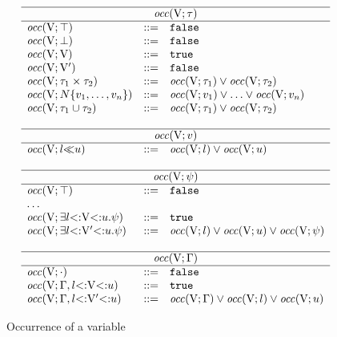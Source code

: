 \begin{figure}
\footnotesize
\[
\begin{array}{lcl}
    \hline
    \multicolumn{3}{c}{\occdflt{\ty}} \\ 
    \hline 
    \occdflt{\tyany} &::=& \false\\
    \occdflt{\tybot} &::=& \false\\
    \occdflt{\vany}  &::=& \true\\
    \occdflt{\vany'}  &::=& \false\\
    \occdflt{\typair{\ty_1}{\ty_2}}  &::=& \occdflt{\ty_1} \lor \occdflt{\ty_2}\\
    \occdflt{\tyinv\iname{\rexvar_1,\ldots,\rexvar_n}} &::=&
        \occdflt{\rexvar_1} \lor \ldots \lor \occdflt{\rexvar_n}\\
    \occdflt{\tyunion{\ty_1}{\ty_2}} &::=& \occdflt{\ty_1} \lor \occdflt{\ty_2}\\
    \\
    \hline
    \multicolumn{3}{c}{\occdflt{\rexvar}} \\ 
    \hline 
    \occdflt{\rexvarbound{\tylb}{\tyub}} &::=& \occdflt{\tylb} \lor \occdflt{\tyub}\\
    \\
    \hline
    \multicolumn{3}{c}{\occdflt{\tysig}} \\ 
    \hline 
    \occdflt{\tyany} &::=& \false\\
    \multicolumn{3}{l}{\ldots} \\
    \occdflt{\tyexist{\vany}{\tylb}{\tyub}{\tysig}} &::=& \true\\
    \occdflt{\tyexist{\vany'}{\tylb}{\tyub}{\tysig}} &::=& 
        \occdflt{\tylb} \lor \occdflt{\tyub} \lor \occdflt{\tysig}\\
    \\
    \hline
    \multicolumn{3}{c}{\occdflt{\AEnv}} \\ 
    \hline 
    \occdflt{\EmptyEnv} &::=& \false \\
    \occdflt{\AEnv, \varbound{\vany}{\tylb}{\tyub}} &::=& \true\\
    \occdflt{\AEnv, \varbound{\vany'}{\tylb}{\tyub}} &::=& 
        \occdflt{\AEnv} \lor \occdflt{\tylb} \lor \occdflt{\tyub}\\
\end{array}
\]
\caption{Occurrence of a variable}\label{fig:var-occ}
\end{figure}

